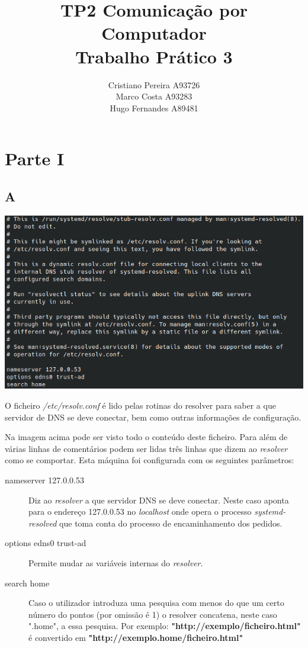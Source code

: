 \documentclass{report}
\title{TP2}
\title{
    Comunicação por Computador \\
    \large{Trabalho Prático 3}
}
\author{
    Cristiano Pereira A93726 \\
    Marco Costa A93283 \\
    Hugo Fernandes A89481
}
\affil{
    Universidade do Minho \\
    Departamento de Informática
}
\begin{document}
    \maketitle
    \newpage

    \section*{Parte I}
        \subsection*{A}
            \noindent
            \includegraphics[width=\textwidth]{images/resolv.conf.png}
            \par
                O ficheiro \textit{/etc/resolv.conf} é lido pelas rotinas do resolver para saber
            a que servidor de DNS se deve conectar, bem como outras informações de configuração.\par 
                Na imagem acima pode ser visto todo o conteúdo deste ficheiro. Para além de várias linhas de comentários
            podem ser lidas três linhas que dizem ao \textit{resolver} como se comportar. Esta máquina foi configurada com os seguintes parâmetros: 
            \begin{description}
                \item[nameserver 127.0.0.53] Diz ao \textit{resolver} a que servidor DNS se deve conectar. Neste caso aponta para o endereço 127.0.0.53 no
                \textit{localhost} onde opera o processo \textit{systemd-resolved} que toma conta do processo de encaminhamento dos pedidos.
                \item[options edns0 trust-ad] Permite mudar as variáveis internas do \textit{resolver}.
                \item[search home] Caso o utilizador introduza uma pesquisa com menos do que um certo número do pontos (por omissão é 1) o resolver concatena, neste caso ".home", a essa pesquisa.
                Por exemplo: \textbf{"http://exemplo/ficheiro.html"} é convertido em \textbf{"http://exemplo.home/ficheiro.html"}
            \end{description}
        \pagebreak
\end{document}
